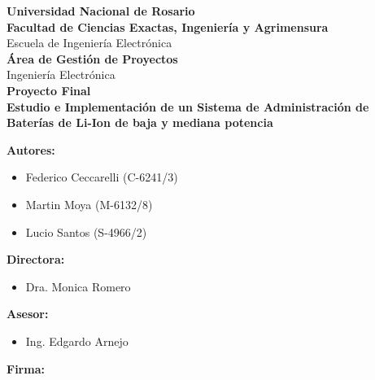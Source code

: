 \documentclass[10pt,a4paper]{article}
\begin{document}
\begin{titlepage}
\begin{center}
			\large{ \textbf{Universidad Nacional de Rosario}} \\[5mm]
			\textbf{Facultad de Ciencias Exactas, Ingeniería y Agrimensura} \\[5mm]
			Escuela de Ingeniería Electrónica \\[20mm]
			\Large {\textbf{Área de Gestión de Proyectos}}\\[1.5mm]
			\small {Ingeniería Electrónica} \\[20mm]
			\Large {\textbf{Proyecto Final}} \\[5mm]
			\Large{ \textbf{Estudio e Implementación de un Sistema de Administración de Baterías de Li-Ion de baja y mediana potencia}} \\[15mm]
			
		\end{center}

		\begin{minipage}[t]{0.6\textwidth}
			{\large\textbf{Autores:}}
			\begin{itemize}
				\item [] Federico Ceccarelli (C-6241/3)
				\item [] Martin Moya (M-6132/8)
				\item [] Lucio Santos (S-4966/2)
			\end{itemize}
			\vspace{10pt}
			{\large\textbf{Directora:}}

			\begin{itemize}
			     \item [] Dra. Monica Romero
			\end{itemize}
            \vspace{10pt}
			{\large\textbf{Asesor:}}
			 \begin{itemize}
                 \item [] Ing. Edgardo Arnejo
            \end{itemize}
		\end{minipage}

		\begin{minipage}[t]{0.35\textwidth}
            \flushleft
			\Large\textbf{Firma:}
		\end{minipage}

	\end{titlepage}
    
    \newpage
    
\end{document}
